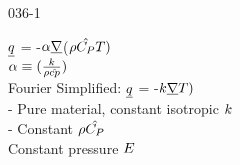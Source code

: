\begin{mitframe}{036-1}

   
     $\underline{\heatflux}$ = -$\tdiff\gradop$($\dens\hat{\cp}\Temp)$ \\
    
     $\tdiff \equiv (\frac{\thermcond}{\dens\hat{cp}})$\\
    
    Fourier Simplified: $\underline{\heatflux}$ = -$\thermcond\gradop\Temp)$ \\
    
    - Pure material, constant isotropic $\thermcond$ \\
    
    - Constant $\dens\hat{\cp}$\\
    Constant pressure 
    $\energy$\\
\end{mitframe}